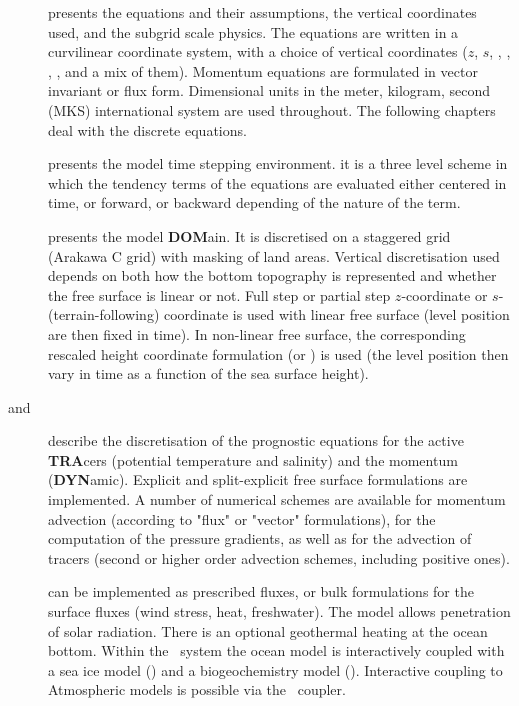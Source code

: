 \begin{description}
\item [] presents the equations and their assumptions, the vertical coordinates used,
and the subgrid scale physics.
The equations are written in a curvilinear coordinate system, with a choice of vertical coordinates
($z$, $s$, \zstar, \sstar, \ztilde, \stilde, and a mix of them).
Momentum equations are formulated in vector invariant or flux form.
Dimensional units in the meter, kilogram, second (MKS) international system are used throughout.
The following chapters deal with the discrete equations.
\item [] presents the model time stepping environment.
it is a three level scheme in which the tendency terms of the equations are evaluated either
centered in time, or forward, or backward depending of the nature of the term.
\item [] presents the model \textbf{DOM}ain.
It is discretised on a staggered grid (Arakawa C grid) with masking of land areas.
Vertical discretisation used depends on both how the bottom topography is represented and whether
the free surface is linear or not.
Full step or partial step $z$-coordinate or $s$- (terrain-following) coordinate is used with
linear free surface (level position are then fixed in time).
In non-linear free surface, the corresponding rescaled height coordinate formulation
(\zstar or \sstar) is used
(the level position then vary in time as a function of the sea surface height).
\item [ and ] describe the discretisation of
the prognostic equations for the active \textbf{TRA}cers (potential temperature and salinity) and
the momentum (\textbf{DYN}amic).
Explicit and split-explicit free surface formulations are implemented.
A number of numerical schemes are available for momentum advection (according to "flux" or "vector" formulations),
for the computation of the pressure gradients, as well as for the advection of tracers
(second or higher order advection schemes, including positive ones).
\item [] can be implemented as prescribed fluxes,
or bulk formulations for the surface fluxes (wind stress, heat, freshwater).
The model allows penetration of solar radiation.
There is an optional geothermal heating at the ocean bottom.
Within the \NEMO\ system the ocean model is interactively coupled with
a sea ice model (\SIcube) and a biogeochemistry model (\PISCES).
Interactive coupling to Atmospheric models is possible via the \OASIS\ coupler.

\end{description}
